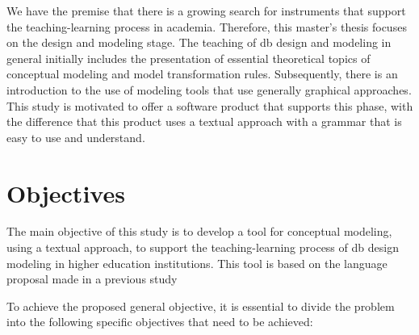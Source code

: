 We have the premise that there is a growing search for instruments that support the teaching-learning process in academia.
Therefore, this master's thesis focuses on the design and modeling stage.
The teaching of \ac{db} design and modeling in general initially includes the presentation of essential theoretical topics of conceptual modeling and model transformation rules.
Subsequently, there is an introduction to the use of modeling tools that use generally graphical approaches.
This study is motivated to offer a software product that supports this phase, with the difference that this product uses a textual approach with a grammar that is easy to use and understand.

\section{Objectives}

The main objective of this study is to develop a tool for conceptual modeling, using a textual approach, to support the teaching-learning process of \ac{db} design modeling in higher education institutions.
This tool is based on the language proposal made in a previous study \cite{Lopes:2019}

To achieve the proposed general objective, it is essential to divide the problem into the following specific objectives that need to be achieved:


